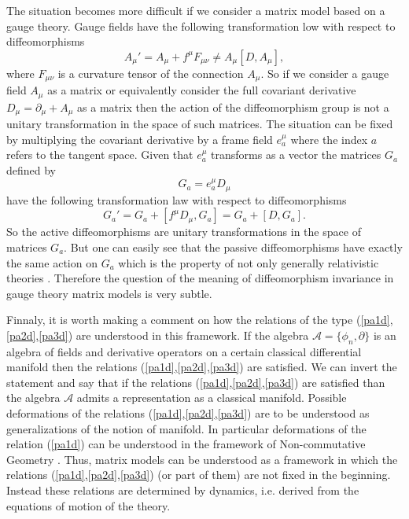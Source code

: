 \documentclass[a4paper,11pt]{article}
\begin{document}
The situation becomes more difficult if we consider a matrix model
based on a gauge theory. Gauge fields have the following
transformation low with respect to diffeomorphisms
\begin{equation}
A_\mu'=A_\mu +f^\mu F_{\mu \nu} \not=A_\mu [D,A_\mu],
\end{equation}
where $F_{\mu \nu}$ is a curvature tensor of the connection
$A_\mu$. So if we consider a gauge field $A_\mu$ as a matrix or
equivalently consider the full covariant derivative
$D_\mu=\partial_\mu+A_\mu$ as a matrix then the action of the
diffeomorphism group is not a unitary transformation in the space
of such matrices. The situation can be fixed by multiplying the
covariant derivative by a frame field $e^\mu_a$ where the index
$a$ refers to the tangent space. Given that $e^\mu_a$ transforms
as a vector the matrices $G_a$ defined by
\begin{equation}
G_a=e^\mu_a D_\mu
\end{equation}
have the following transformation law with respect to
diffeomorphisms
\begin{equation}
G_a'=G_a+[f^\mu D_\mu, G_a]=G_a+[D,G_a].
\end{equation}
So the active diffeomorphisms are unitary transformations in the
space of matrices $G_a$. But one can easily see that the passive
diffeomorphisms have exactly the same action on $G_a$ which is the
property of not only generally relativistic theories . Therefore
the question of the meaning of diffeomorphism invariance in gauge
theory matrix models is very subtle.

Finnaly, it is worth making a comment on how the relations of the
type (\ref{pa1d},\ref{pa2d},\ref{pa3d}) are understood in this
framework. If the algebra ${\mathcal A}=\{\phi_n,\partial\}$ is an
algebra of fields and derivative operators on a certain classical
differential manifold then the relations
(\ref{pa1d},\ref{pa2d},\ref{pa3d}) are satisfied.  We can invert
the statement and say that if the relations
(\ref{pa1d},\ref{pa2d},\ref{pa3d}) are satisfied than the algebra
${\mathcal A}$ admits a representation as a classical manifold.
Possible deformations of the relations
(\ref{pa1d},\ref{pa2d},\ref{pa3d}) are to be understood as
generalizations of the notion of manifold. In particular
deformations of the relation (\ref{pa1d}) can be understood in the
framework of Non-commutative Geometry \cite{connes}. Thus, matrix
models can be understood as a framework in which the relations
(\ref{pa1d},\ref{pa2d},\ref{pa3d}) (or part of them) are not fixed
in the beginning. Instead  these relations  are determined by
dynamics, i.e. derived from the equations of motion of the theory.
\end{document}
